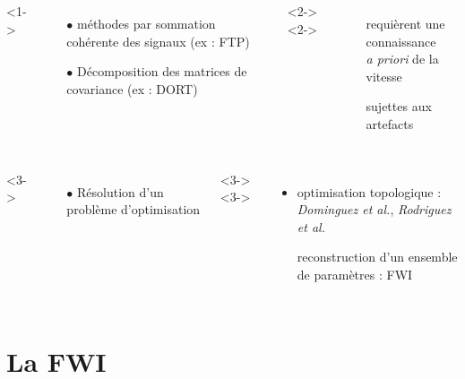 \begin{frame}{\insertsectionhead}
\begin{small}
\begin{columns}[c]
	\end{columns}
	\begin{columns}[c]
			<1->
				\begin{itemize}
					\item[$\bullet$] méthodes par sommation cohérente des signaux (ex : FTP)
					\item[$\bullet$] Décomposition des matrices de covariance (ex : DORT)
				\end{itemize}
			<2->
			<2->
				\begin{itemize}
					\item[\ding{55}] requièrent une connaissance\\ \emph{a priori} de la vitesse\\
					\item[\ding{55}] sujettes aux artefacts
				\end{itemize}
	\end{columns}
	\vspace{0.1cm}
	\begin{columns}[c]
		<3->
			\begin{itemize}
				\item[$\bullet$] Résolution d'un problème d'optimisation
			\end{itemize}
		<3->
		<3->
			\begin{itemize}
			\item optimisation topologique :\\\hspace{-0.5cm}\small{\emph{Dominguez et al.}, \emph{Rodriguez et al.}}\\[0.1cm]
			\item[\ding{51}] {reconstruction d'un ensemble de paramètres : FWI}
		\end{itemize}		
	\end{columns}
\end{small}
\end{frame} 


\section{La FWI}
